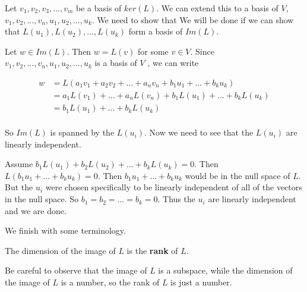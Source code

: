 \documentclass{ximera}
\begin{document}
 \begin{free-response}
 	Let $v_1,v_2,v_3,...,v_m$ be a basis of $ker(L)$.  We can extend this to a basis of $V$, $v_1,v_2,...,v_n,u_1,u_2,...,u_k$.  We need to show that 
 	We will be done if we can show that $L(u_1),L(u_2),...,L(u_k)$ form a basis of $Im(L)$.
 	
 	Let $w \in Im(L)$.  Then $w = L(v)$ for some $v \in V$.  Since $v_1,v_2,...,v_n,u_1,u_2,...,u_k$ is a basis of $V$ , we can write
 	
 	\begin{align*}
 		w &= L( a_1v_1+a_2v_2+...+a_nv_n+b_1u_1+...+b_ku_k)\\
 			&=a_1L(v_1)+...+a_nL(v_n)+b_1L(u_1)+...+b_kL(u_k)\\
 			&=b_1L(u_1)+...+b_kL(u_k)\\
 	\end{align*}
 	
 	So $Im(L)$ is spanned by the $L(u_i)$.  Now we need to see that the $L(u_i)$ are linearly independent.
 	
 	Assume $b_1L(u_1)+b_2L(u_2)+...+b_kL(u_k) = 0$.  Then $L(b_1u_1+...+b_ku_k) = 0$.  Then $b_1u_1+...+b_ku_k$ would be in the null space of $L$.  But
 	the $u_i$ were chosen specifically to be linearly independent of all of the vectors in the null space.  So $b_1=b_2=...=b_k = 0$.   Thus the $u_i$ are linearly independent
 	and we are done.
 \end{free-response}

We finish with some terminology.

\begin{definition}
  The dimension of the image of $L$ is the \textbf{rank} of $L$.
\end{definition}

Be careful to observe that the image of $L$ is a subspace, while the dimension of the image of $L$
is a number, so the rank of $L$ is just a number.
\end{document}
